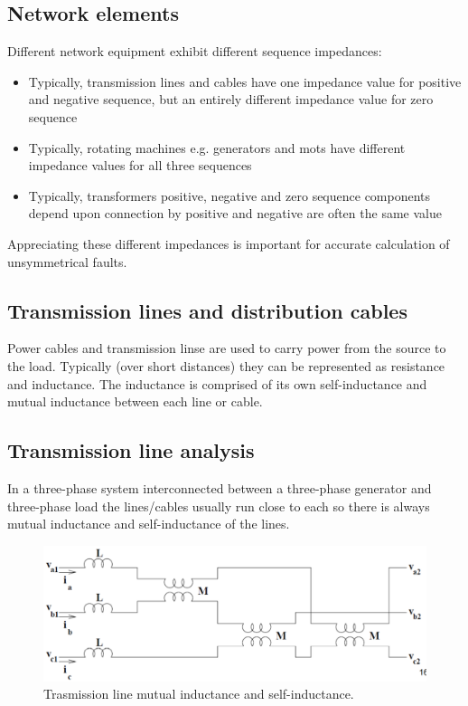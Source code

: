 \documentclass[class=report, crop=false, 12pt,a4paper]{standalone}
\begin{document}
\subsection{Network elements}
Different network equipment exhibit different sequence impedances:
\begin{itemize}
	\item Typically, transmission lines and cables have one impedance value for positive and negative sequence, but an entirely different impedance value for zero sequence
	\item Typically, rotating machines e.g. generators and mots have different impedance values for all three sequences
	\item Typically, transformers positive, negative and zero sequence components depend upon connection by positive and negative are often the same value
\end{itemize}
Appreciating these different impedances is important for accurate calculation of unsymmetrical faults.
\subsection{Transmission lines and distribution cables}
Power cables and transmission linse are used to carry power from the source to the load. Typically (over short distances) they can be represented as resistance and inductance. The inductance is comprised of its own self-inductance and mutual inductance between each line or cable.
\subsection{Transmission line analysis}
In a three-phase system interconnected between a three-phase generator and three-phase load the lines/cables usually run close to each so there is always mutual inductance and self-inductance of the lines.
\begin{figure}[H]
	\centering
	\includegraphics[width = \textwidth]{../img/figure32.png}
	\caption{Trasmission line mutual inductance and self-inductance.}
\end{figure}
\end{document}

